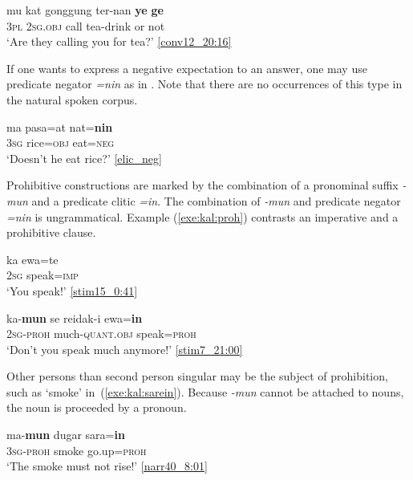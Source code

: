 \documentclass[output=paper,colorlinks,citecolor=brown,draft]{langscibook}
\begin{document}
\ea \label{exe:kal:yege1}
\gll mu kat gonggung ter-nan \textbf{ye} \textbf{ge}\\
\textsc{3pl} \textsc{2sg.obj} call tea-drink or not\\
\glt `Are they calling you for tea?' {\href{http://hdl.handle.net/10050/00-0000-0000-0004-1BBD-5}{[conv12\_20:16]}}
\z 	

If one wants to express a negative expectation to an answer, one may use predicate negator \textit{=nin} as in . Note that there are no occurrences of this type in the natural spoken corpus.

\ea\label{exe:kal:natnin}{
	\gll ma pasa=at nat=\textbf{nin}
	\\
	\textsc{3sg} rice=\textsc{obj} eat=\textsc{neg}\\
	\glt `Doesn't he eat rice?' {\href{http://hdl.handle.net/10050/00-0000-0000-0004-1C60-A}{[elic\_neg]}}
}
\z 

Prohibitive constructions are marked by the combination of a pronominal suffix \textit{-mun} and a predicate clitic \textit{=in}. The combination of \textit{-mun} and predicate negator \textit{=nin} is ungrammatical. Example (\ref{exe:kal:proh}) contrasts an imperative and a prohibitive clause.

\ea \label{exe:kal:proh}
\ea \label{exe:kal:eware}
{\gll ka ewa=te\\
	\textsc{2sg} speak=\textsc{imp}\\
	\glt `You speak!' {\href{http://hdl.handle.net/10050/00-0000-0000-0004-1C75-D}{[stim15\_0:41]}}}

\ex \label{exe:kal:ewain}	{\gll ka-\textbf{mun} se reidak-i ewa=\textbf{in}\\
	\textsc{2sg-proh} {\glse} much-\textsc{quant.obj} speak=\textsc{proh}\\
	\glt 	`Don't you speak much anymore!' {\href{http://hdl.handle.net/10050/00-0000-0000-0004-1BAA-C}{[stim7\_21:00]}}
}
\z \z 

Other persons than second person singular may be the subject of prohibition, such as `smoke' in~(\ref{exe:kal:sarein}). Because \textit{-mun} cannot be attached to nouns, the noun is proceeded by a pronoun.

\ea \label{exe:kal:sarein}
{\gll ma-\textbf{mun} dugar sara=\textbf{in}\\
	\textsc{3sg-proh} smoke go.up=\textsc{proh}\\
	\glt 	`The smoke must not rise!' {\href{http://hdl.handle.net/10050/00-0000-0000-0004-1BBB-2}{[narr40\_8:01]}}
}
\z 
\end{document}
